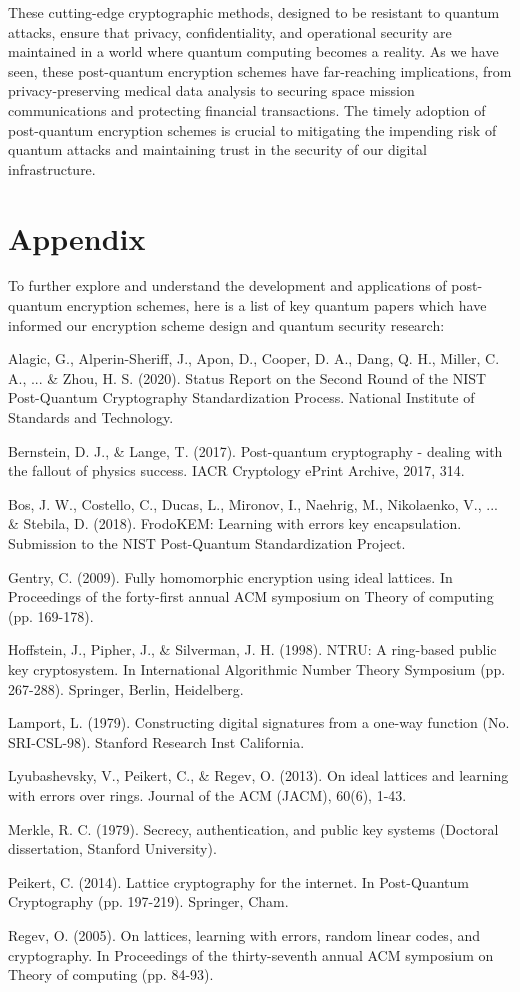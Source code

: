 \documentclass[11pt]{article}
\begin{document}
These cutting-edge cryptographic methods, designed to be resistant to quantum attacks, ensure that privacy, confidentiality, and operational security are maintained in a world where quantum computing becomes a reality. As we have seen, these post-quantum encryption schemes have far-reaching implications, from privacy-preserving medical data analysis to securing space mission communications and protecting financial transactions. The timely adoption of post-quantum encryption schemes is crucial to mitigating the impending risk of quantum attacks and maintaining trust in the security of our digital infrastructure.


\section{Appendix}

To further explore and understand the development and applications of post-quantum encryption schemes, here is a list of key quantum papers which have informed our encryption scheme design and quantum security research:


Alagic, G., Alperin-Sheriff, J., Apon, D., Cooper, D. A., Dang, Q. H., Miller, C. A., ... \& Zhou, H. S. (2020). Status Report on the Second Round of the NIST Post-Quantum Cryptography Standardization Process. National Institute of Standards and Technology.


Bernstein, D. J., \& Lange, T. (2017). Post-quantum cryptography - dealing with the fallout of physics success. IACR Cryptology ePrint Archive, 2017, 314.


Bos, J. W., Costello, C., Ducas, L., Mironov, I., Naehrig, M., Nikolaenko, V., ... \& Stebila, D. (2018). FrodoKEM: Learning with errors key encapsulation. Submission to the NIST Post-Quantum Standardization Project.


Gentry, C. (2009). Fully homomorphic encryption using ideal lattices. In Proceedings of the forty-first annual ACM symposium on Theory of computing (pp. 169-178).


Hoffstein, J., Pipher, J., \& Silverman, J. H. (1998). NTRU: A ring-based public key cryptosystem. In International Algorithmic Number Theory Symposium (pp. 267-288). Springer, Berlin, Heidelberg.


Lamport, L. (1979). Constructing digital signatures from a one-way function (No. SRI-CSL-98). Stanford Research Inst California.


Lyubashevsky, V., Peikert, C., \& Regev, O. (2013). On ideal lattices and learning with errors over rings. Journal of the ACM (JACM), 60(6), 1-43.


Merkle, R. C. (1979). Secrecy, authentication, and public key systems (Doctoral dissertation, Stanford University).


Peikert, C. (2014). Lattice cryptography for the internet. In Post-Quantum Cryptography (pp. 197-219). Springer, Cham.


Regev, O. (2005). On lattices, learning with errors, random linear codes, and cryptography. In Proceedings of the thirty-seventh annual ACM symposium on Theory of computing (pp. 84-93).
\end{document}
